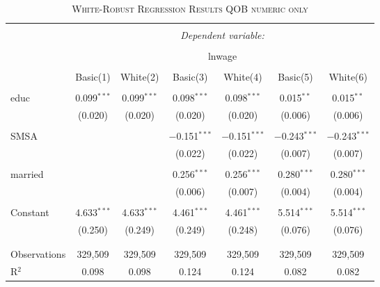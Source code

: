 \documentclass[a4paper]{article}
\begin{document}
\begin{table}[!htbp] \centering 
\begin{adjustwidth}{1.25cm}{-0cm}
\begin{threeparttable}
\small
\captionsetup{font=small, justification=raggedright,singlelinecheck=false}
\caption{\textsc{White-Robust Regression Results QOB numeric only}}
\centering 
  \label{}
\small 
\begin{tabular}{@{\extracolsep{-2pt}}lcccccc} 
\\[-5.8ex]\hline 
\hline \\[-1.8ex] 
 & \multicolumn{6}{c}{\textit{Dependent variable:}} \\ 
\cline{2-7} 
\\[-1.8ex] & \multicolumn{6}{c}{lnwage} \\ 
\\[-1.8ex] & Basic(1) & White(2) & Basic(3) & White(4) & Basic(5) & White(6)\\ 
\hline \\[-1.8ex] 
 educ & 0.099$^{***}$ & 0.099$^{***}$ & 0.098$^{***}$ & 0.098$^{***}$ & 0.015$^{**}$ & 0.015$^{**}$ \\ 
  & (0.020) & (0.020) & (0.020) & (0.020) & (0.006) & (0.006) \\ 
  & & & & & & \\ 
 SMSA &  &  & $-$0.151$^{***}$ & $-$0.151$^{***}$ & $-$0.243$^{***}$ & $-$0.243$^{***}$ \\ 
  &  &  & (0.022) & (0.022) & (0.007) & (0.007) \\ 
  & & & & & & \\ 
 married &  &  & 0.256$^{***}$ & 0.256$^{***}$ & 0.280$^{***}$ & 0.280$^{***}$ \\ 
  &  &  & (0.006) & (0.007) & (0.004) & (0.004) \\ 
  & & & & & & \\ 
 Constant & 4.633$^{***}$ & 4.633$^{***}$ & 4.461$^{***}$ & 4.461$^{***}$ & 5.514$^{***}$ & 5.514$^{***}$ \\ 
  & (0.250) & (0.249) & (0.249) & (0.248) & (0.076) & (0.076) \\ 
  & & & & & & \\ 
\hline \\[-1.8ex] 
Observations & 329,509 & 329,509 & 329,509 & 329,509 & 329,509 & 329,509 \\ 
R$^{2}$ & 0.098 & 0.098 & 0.124 & 0.124 & 0.082 & 0.082 \\ 

\end{tabular}
\end{threeparttable}
\end{adjustwidth}
\end{table}
\end{document}
